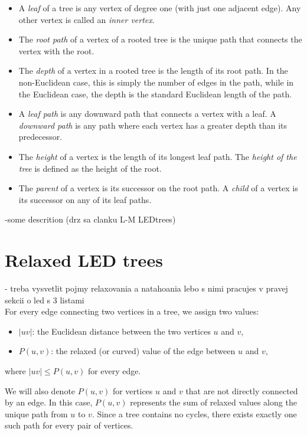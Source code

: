 \documentclass[12pt]{book}
\newcommand{\Price}[2]{P(#1,#2)}
\begin{document}
		\begin{itemize}
			\item A \emph{leaf} of a tree is any vertex of degree one (with just one adjacent edge). Any other vertex is called an \emph{inner vertex}.
			\item The \emph{root path} of a vertex of a rooted tree is the unique path that connects the vertex with the root.
			\item The \emph{depth} of a vertex in a rooted tree is the length of its root path. In the non-Euclidean case, this is simply the number of edges in the path, while in the Euclidean case, the depth is the standard Euclidean length of the path.
			\item A \emph{leaf path} is any downward path that connects a vertex with a leaf. A \emph{downward path} is any path where each vertex has a greater depth than its predecessor.
			\item The \emph{height} of a vertex is the length of its longest leaf path. The \emph{height of the tree} is defined as the height of the root.
			\item The \emph{parent} of a vertex is its successor on the root path. A \emph{child} of a vertex is its successor on any of its leaf paths.
		\end{itemize}
		
		
		-some descrition (drz sa clanku L-M LEDtrees)
		
	\section{Relaxed LED trees}	
	
		- treba vysvetlit pojmy relaxovania a natahoania lebo s nimi pracujes v pravej sekcii o led s 3 listami
			\\
		
				
		For every edge connecting two vertices in a tree, we assign two values:
		\begin{itemize}
			\item \( |uv| \): the Euclidean distance between the two vertices \( u \) and \( v \),
			\item \( \Price{u}{v} \): the relaxed (or curved) value of the edge between \( u \) and \( v \),
		\end{itemize}
		where \( |uv| \leq \Price{u}{v} \) for every edge.
		
		We will also denote \( \Price{u}{v} \) for vertices \( u \) and \( v \) that are not directly connected by an edge. In this case, \( \Price{u}{v} \) represents the sum of relaxed values along the unique path from \( u \) to \( v \). Since a tree contains no cycles, there exists exactly one such path for every pair of vertices.
		
\end{document}
